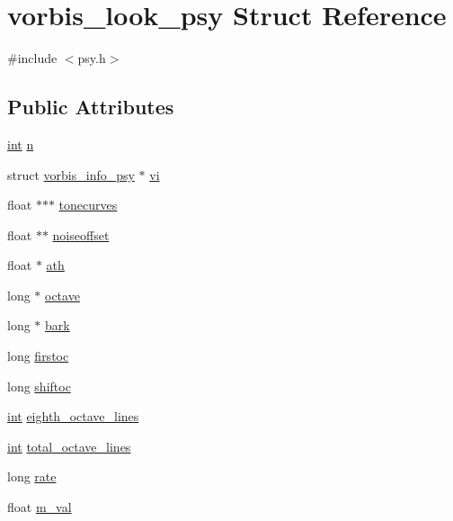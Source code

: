 \hypertarget{structvorbis__look__psy}{}\section{vorbis\+\_\+look\+\_\+psy Struct Reference}
\label{structvorbis__look__psy}


{\ttfamily \#include $<$psy.\+h$>$}

\subsection*{Public Attributes}
\begin{DoxyCompactItemize}
\item 
\hyperlink{xmltok_8h_a5a0d4a5641ce434f1d23533f2b2e6653}{int} \hyperlink{structvorbis__look__psy_a32e7f5f9a3c335d9376c9b3ffb3dd929}{n}
\item 
struct \hyperlink{structvorbis__info__psy}{vorbis\+\_\+info\+\_\+psy} $\ast$ \hyperlink{structvorbis__look__psy_a7e8428a907f20c860e64ec33d45309d8}{vi}
\item 
float $\ast$$\ast$$\ast$ \hyperlink{structvorbis__look__psy_af99844cac8795514329522d9855d0494}{tonecurves}
\item 
float $\ast$$\ast$ \hyperlink{structvorbis__look__psy_a856b96ea21a9902f3564f0baa81de0d4}{noiseoffset}
\item 
float $\ast$ \hyperlink{structvorbis__look__psy_a3446b16512508584e3d81cfbb07ab390}{ath}
\item 
long $\ast$ \hyperlink{structvorbis__look__psy_a3bd4830be6d4d265ab06dbbc26926648}{octave}
\item 
long $\ast$ \hyperlink{structvorbis__look__psy_ab26f48178c7d4493eb8a814553441844}{bark}
\item 
long \hyperlink{structvorbis__look__psy_aa989a7d275eaa49f05d406a9760c9fcc}{firstoc}
\item 
long \hyperlink{structvorbis__look__psy_a97ab9b72727138cef93f0b930bc47568}{shiftoc}
\item 
\hyperlink{xmltok_8h_a5a0d4a5641ce434f1d23533f2b2e6653}{int} \hyperlink{structvorbis__look__psy_afc52eca23e371be299e975dbedb16340}{eighth\+\_\+octave\+\_\+lines}
\item 
\hyperlink{xmltok_8h_a5a0d4a5641ce434f1d23533f2b2e6653}{int} \hyperlink{structvorbis__look__psy_adf9a21c963c42ef1ccc000ab4127af09}{total\+\_\+octave\+\_\+lines}
\item 
long \hyperlink{structvorbis__look__psy_ab670c918ba2eea41e7dfed9d3ac33294}{rate}
\item 
float \hyperlink{structvorbis__look__psy_aacbda1e90ed61475b1d1c6d81adc0cbb}{m\+\_\+val}
\end{DoxyCompactItemize}


